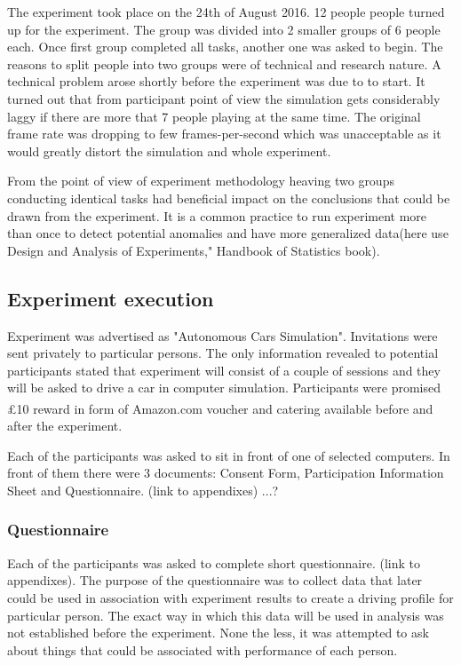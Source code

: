 \documentclass[11pt,english]{article}
\begin{document}
The experiment took place on the 24th of August 2016. 12 people people turned up for the experiment. The group was divided into 2 smaller groups of 6 people each. Once first group completed all tasks, another one was asked to begin. The reasons to split people into two groups were of technical and research nature. A technical problem arose shortly before the experiment was due to to start. It turned out that from participant point of view the simulation gets considerably laggy if there are more that 7 people playing at the same time. The original frame rate was dropping to few frames-per-second which was unacceptable as it would greatly distort the simulation and whole experiment.

From the point of view of experiment methodology heaving two groups conducting identical tasks had beneficial impact on the conclusions that could be drawn from the experiment. It is a common practice to run experiment more than once to detect potential anomalies and have more generalized data(here use Design and Analysis of Experiments," Handbook of Statistics book).



\subsection{Experiment execution}


Experiment was advertised as "Autonomous Cars Simulation". Invitations were sent privately to particular persons. The only information revealed to potential participants stated that experiment will consist of a couple of sessions and they will be asked to drive a car in computer simulation. Participants were promised £10 reward in form of Amazon.com\textsuperscript{\textregistered} voucher and catering available before and after the experiment.


Each of the participants was asked to sit in front of one of selected computers. In front of them there were 3 documents: Consent Form, Participation Information Sheet and Questionnaire. (link to appendixes)
...?

\subsubsection{Questionnaire}

Each of the participants was asked to complete short questionnaire. (link to appendixes). The purpose of the questionnaire was to collect data that later could be used in association with experiment results to create a driving profile for particular person. The exact way in which this data will be used in analysis was not established before the experiment. None the less, it was attempted to ask about things that could be associated with performance of each person.
\end{document}
